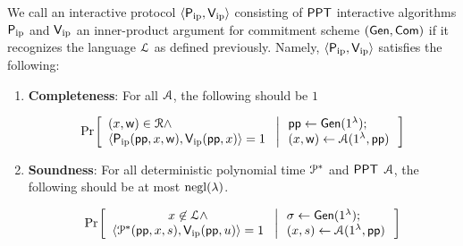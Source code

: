 \begin{definition}\label{defn:innerproductarg} 
	We call an interactive protocol $\langle \mathsf{P}_\mathrm{ip},\mathsf{V}_\mathrm{ip}\rangle$ consisting of $\mathsf{PPT}$ interactive algorithms $\mathsf{P}_\mathrm{ip}$ and $\mathsf{V}_\mathrm{ip}$ an inner-product argument for commitment scheme $(\mathsf{Gen},\mathsf{Com})$ if it recognizes the language $\mathcal{L}$ as defined previously. Namely, $\langle \mathsf{P}_\mathrm{ip},\mathsf{V}_\mathrm{ip}\rangle$ satisfies the following:
	\begin{enumerate}[{\rm (i)}]
		\item {\bf Completeness}: For all $\mathcal{A}$, the following should be $1$
		
		\fontsize{7}{8} %
		\begin{align*}
		\condprob{
			\begin{array}{l}
			(\stmt,\wit)\in \calR \wedge \\ \langle \pip(\mathsf{pp},\stmt,\wit),\vip(\mathsf{pp},\stmt)\rangle=1
			\end{array}}{
			\begin{array}{l}
			\mathsf{pp}\gets \gen(\secparam);\\
			(\stmt,\wit)\gets \adv(\secparam,\mathsf{pp})
			\end{array}
		}
		\end{align*}
		\normalsize
		\item{\bf Soundness}: For all deterministic polynomial time $\mathcal{P}^*$ and $\mathsf{PPT}$  $\mathcal{A}$, the following should be at most $\mathrm{negl}(\lambda)$.
		
		{\fontsize{7}{8} %
			
			\begin{align*}
			\condprob{
				\begin{array}{c}
				\stmt\not\in \calL \wedge \\
				\langle
				\prover^*(\mathsf{pp},\stmt,s),\vip(\mathsf{pp},u)\rangle=1
				\end{array}}{
				\begin{array}{l}
				\sigma\gets \gen(\secparam);\\
				(\stmt,s)\gets \adv(\secparam,\mathsf{pp})
				\end{array}
			} 
			\end{align*}
		}
	\end{enumerate}
	
\end{definition}
